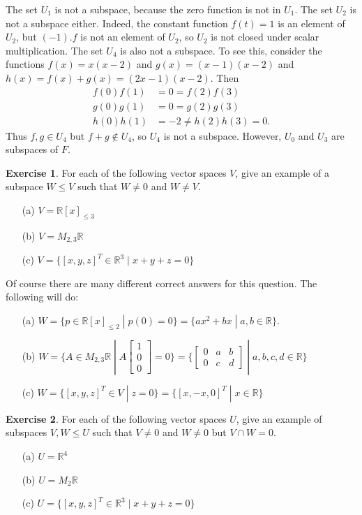 \documentclass{amsart}
\newcommand{\R}         {{\mathbb{R}}}
\newcommand{\bsm}       {\left[\begin{smallmatrix}}
\newcommand{\esm}       {\end{smallmatrix}\right]}
\newcommand{\st}        {\;|\;}
\renewcommand{\:}       {\colon}
\theoremstyle{definition}
\newtheorem{exercise}{Exercise}[section]
\renewenvironment{solution}{\SolutionAtEnd}{\endSolutionAtEnd}
\begin{document}
\begin{solution}
 The set $U_1$ is not a subspace, because the zero function
 is not in $U_1$.  The set $U_2$ is not a subspace either.
 Indeed, the constant function $f(t)=1$ is an element of
 $U_2$, but $(-1).f$ is not an element of $U_2$, so $U_2$ is
 not closed under scalar multiplication.  The set $U_4$ is
 also not a subspace.  To see this, consider the functions
 $f(x)=x(x-2)$ and $g(x)=(x-1)(x-2)$ and
 $h(x)=f(x)+g(x)=(2x-1)(x-2)$.  Then
 \begin{align*}
  f(0)f(1) &= 0 = f(2)f(3) \\
  g(0)g(1) &= 0 = g(2)g(3) \\
  h(0)h(1) &= -2 \neq h(2)h(3) = 0.
 \end{align*}
 Thus $f,g\in U_4$ but $f+g\not\in U_4$, so $U_4$ is not a
 subspace.  However, $U_0$ and $U_3$ are subspaces of $F$.
\end{solution}
\begin{exercise}
 For each of the following vector spaces $V$, give an
 example of a subspace $W\leq V$ such that $W\neq 0$ and
 $W\neq V$.  
 \begin{itemize}
  \item[(a)] $V=\R[x]_{\leq 3}$
  \item[(b)] $V=M_{2,3}\R$
  \item[(c)] $V=\{[x,y,z]^T\in\R^3\st x+y+z=0\}$
 \end{itemize}
\end{exercise}
\begin{solution}
 Of course there are many different correct answers for this
 question.  The following will do:
 \begin{itemize}
  \item[(a)]
   $W=\{p\in \R[x]_{\leq 2}\st p(0)=0\}=\{ax^2+bx\st a,b\in\R\}$.
  \item[(b)]
   $W=\{A\in M_{2,3}\R\st A\bsm 1\\0\\0\esm = 0\}=
     \{\bsm 0&a&b\\ 0&c&d\esm \st a,b,c,d\in\R\}$
  \item[(c)]
   $W=\{[x,y,z]^T\in V\st z=0\}=\{[x,-x,0]^T\st x\in\R\}$
 \end{itemize}
\end{solution}
\begin{exercise}
 For each of the following vector spaces $U$, give an
 example of subspaces $V,W\leq U$ such that $V\neq 0$ and
 $W\neq 0$ but $V\cap W=0$.
 \begin{itemize}
  \item[(a)] $U=\R^4$
  \item[(b)] $U=M_2\R$
  \item[(c)] $U=\{[x,y,z]^T\in\R^3\st x+y+z=0\}$
 \end{itemize}
\end{exercise}
\end{document}
